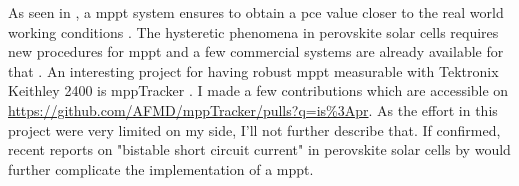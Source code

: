 	As seen in , a \gls{mppt} system ensures to obtain a \gls{pce} value closer to the real world working conditions \cite{Zimmermann2016}.
	The hysteretic phenomena in perovskite solar cells requires new procedures for \gls{mppt} \cite{Cimaroli2017,Pellet2017} and a few commercial systems are already available for that \cite{CicciResearchsrl2019,CandlelightSystems}.
	An interesting project for having robust \gls{mppt} measurable with Tektronix Keithley 2400 is mppTracker \cite{AFMD2017}.
	I made a few contributions which are accessible on \url{https://github.com/AFMD/mppTracker/pulls?q=is%3Apr}.
	As the effort in this project were very limited on my side, I'll not further describe that.
	If confirmed, recent reports on "bistable short circuit current" in perovskite solar cells by  would further complicate the implementation of a \gls{mppt}.
